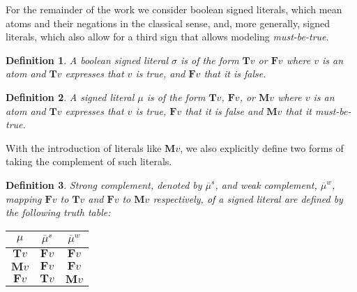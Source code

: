\documentclass[final]{vutinfth} %
\newtheorem{definition}{Definition}[chapter]
\newcommand{\mbt}{must-be-true\xspace}
\newcommand{\negstrong}[1]{\overline{#1}^s}
\newcommand{\negweak}[1]{\overline{#1}^w}
\newcommand{\bT}{\mathbf{T}}
\newcommand{\bM}{\mathbf{M}}
\newcommand{\bF}{\mathbf{F}}
\newcommand{\sgl}{\mu}
\newcommand{\bsgl}{\sigma}
\newcommand{\wkn}{\textit{weaken}}
\begin{document}
For the remainder of the work we consider boolean signed literals, which mean atoms and their negations in the classical sense, and, more generally, signed literals, which also allow for a third sign that allows modeling \emph{\mbt}.

\begin{definition}
A \emph{boolean signed literal} $\bsgl$ is of the form $\bT v$ or $\bF v$ where $v$ is an atom and $\bT v$ expresses that $v$ is \emph{true}, and $\bF v$ that it is \emph{false}.
\end{definition}

\begin{definition}
A \emph{signed literal} $\sgl$ is of the form $\bT v$, $\bF v$, or $\bM v$ where $v$ is an atom and $\bT v$ expresses that $v$ is \emph{true}, $\bF v$ that it is \emph{false} and $\bM v$ that it \emph{\mbt}.
\end{definition}



With the introduction of literals like $\bM v$, we also explicitly define two forms of taking the complement of such literals.

\begin{definition}
Strong complement, denoted by $\negstrong{\sgl}$, and weak complement, $\negweak{\sgl}$, mapping $\bF v$ to $\bT v$ and $\bF v$ to $\bM v$ respectively, of a signed literal are defined by the following truth table:%

\begin{center}
\begin{tabular}{|c|cc|}
\hline
$\sgl$&$\negstrong{\sgl}$&$\negweak{\sgl}$\\
\hline
\hline
$\bT v$&$\bF v$&$\bF v$\\
$\bM v$&$\bF v$&$\bF v$\\
$\bF v$&$\bT v$&$\bM v$\\
\hline
\end{tabular}
\end{center}
\end{definition}
\end{document}
